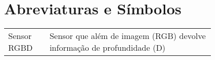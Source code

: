 \chapter*{Abreviaturas e Símbolos}

\begin{flushleft}
\begin{tabular}{l p{0.8\linewidth}}
	Sensor RGBD & Sensor que além de imagem (RGB) devolve informação de profundidade (D)\\
\end{tabular}
\end{flushleft}

